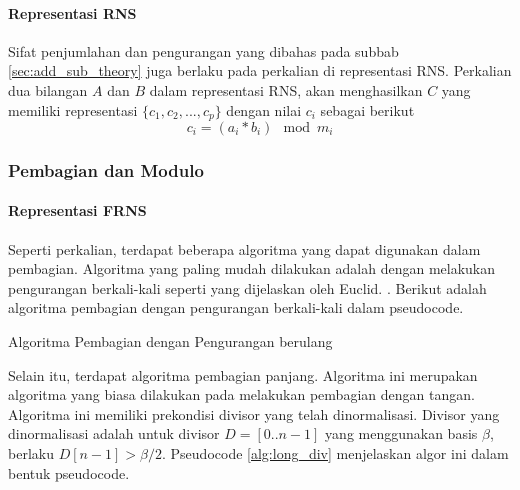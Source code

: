\paragraph{Representasi RNS}
Sifat penjumlahan dan pengurangan yang dibahas pada subbab \ref{sec:add_sub_theory} juga berlaku pada perkalian di representasi RNS. Perkalian dua bilangan $A$ dan $B$ dalam representasi RNS, akan menghasilkan $C$ yang memiliki representasi $\{c_1,c_2,...,c_p\}$ dengan nilai $c_i$ sebagai berikut
\begin{equation}
    c_i = (a_i * b_i) \mod m_i
\end{equation}

\subsubsection{Pembagian dan Modulo}

\paragraph{Representasi FRNS}
Seperti perkalian, terdapat beberapa algoritma yang dapat digunakan dalam pembagian. Algoritma yang paling mudah dilakukan adalah dengan melakukan pengurangan berkali-kali seperti yang dijelaskan oleh Euclid. . Berikut adalah algoritma pembagian dengan pengurangan berkali-kali dalam pseudocode.

\begin{algorithm}
  \caption{Algoritma Pembagian dengan Pengurangan berulang}
  \label{alg:div_repeated_sub}
  \begin{algorithmic}[1]
    \Statex
      \EndWhile
      \State {}
    \EndFunction
  \end{algorithmic}
\end{algorithm}

Selain itu, terdapat algoritma pembagian panjang. Algoritma ini merupakan algoritma yang biasa dilakukan pada melakukan pembagian dengan tangan. Algoritma ini memiliki prekondisi divisor yang telah dinormalisasi. Divisor yang dinormalisasi adalah untuk divisor $D = [0..n-1]$ yang menggunakan basis $\beta$, berlaku $D[n-1] > \beta/2$. Pseudocode \ref{alg:long_div} menjelaskan algor ini dalam bentuk pseudocode.

